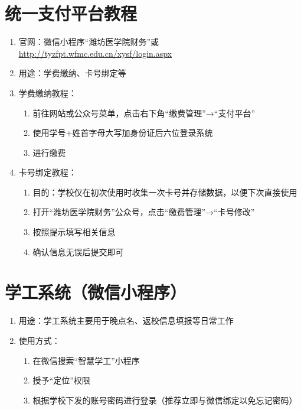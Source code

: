 \section[统一支付平台教程]{统一支付平台教程}
\label{fee_pay}
\begin{enumerate}
    \item 官网：微信小程序“潍坊医学院财务”或\uline{\href{http://tyzfpt.wfmc.edu.cn/xysf/login.aspx}{http://tyzfpt.wfmc.edu.cn/xysf/login.aspx}}
    \item 用途：学费缴纳、卡号绑定等
    \item 学费缴纳教程：
    \begin{enumerate}
        \item 前往网站或公众号菜单，点击右下角“缴费管理”→“支付平台”
        \item 使用学号+姓首字母大写加身份证后六位登录系统
        \item 进行缴费
    \end{enumerate}
    \item 卡号绑定教程：
    \begin{enumerate}
        \item 目的：学校仅在初次使用时收集一次卡号并存储数据，以便下次直接使用\footnotemark
        \item 打开“潍坊医学院财务”公众号，点击“缴费管理”→“卡号修改”
        \item 按照提示填写相关信息
        \item 确认信息无误后提交即可
    \end{enumerate}
\end{enumerate}

\section[学工系统（微信小程序）]{学工系统（微信小程序）}
\begin{enumerate}
    \item 用途：学工系统主要用于晚点名、返校信息填报等日常工作\footnotemark
    \item 使用方式：
          \begin{enumerate}
              \item 在微信搜索“智慧学工”小程序
              \item 授予“定位”权限
              \item 根据学校下发的账号密码进行登录（推荐立即与微信绑定以免忘记密码）
          \end{enumerate}
\end{enumerate}

